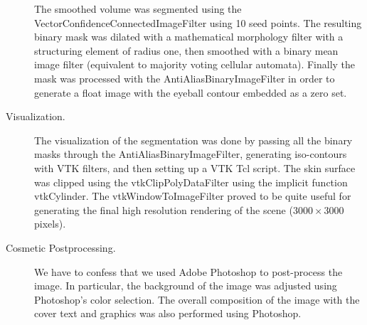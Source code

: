 \begin{description}
The smoothed volume was segmented using the
VectorConfidenceConnectedImageFilter using 10 seed points. The resulting
binary mask was dilated with a mathematical morphology filter with a
structuring element of radius one, then smoothed with a binary mean image
filter (equivalent to majority voting cellular automata). Finally the mask
was processed with the AntiAliasBinaryImageFilter in order to generate a
float image with the eyeball contour embedded as a zero set.

\item[Visualization.]
The visualization of the segmentation was done by passing all the binary
masks through the AntiAliasBinaryImageFilter, generating iso-contours with
VTK filters, and then setting up a VTK Tcl script. The skin surface was
clipped using the vtkClipPolyDataFilter using the implicit function
vtkCylinder. The vtkWindowToImageFilter proved to be quite useful for
generating the final high resolution rendering of the scene ($3000\times3000$
pixels).

\item[Cosmetic Postprocessing.]
We have to confess that we used Adobe Photoshop to post-process the image. In
particular, the background of the image was adjusted using Photoshop's color
selection. The overall composition of the image with the cover text and
graphics was also performed using Photoshop.

\end{description}

\normalsize
